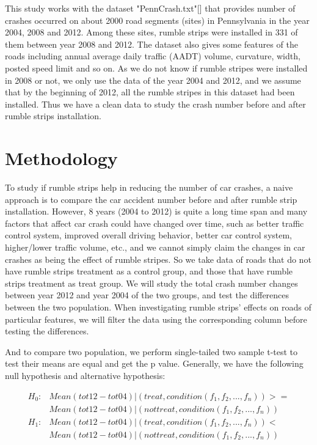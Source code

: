 \documentclass{article}
\begin{document}
This study works with the dataset "PennCrash.txt"[] that provides number of crashes occurred on about 2000 road segments (sites) in Pennsylvania in the year 2004, 2008 and 2012. Among these sites, rumble strips were installed in 331 of them between year 2008 and 2012. The dataset also gives some features of the roads including annual average daily traffic (AADT) volume, curvature, width, posted speed limit and so on. As we do not know if rumble stripes were installed in 2008 or not, we only use the data of the year 2004 and 2012, and we assume that by the beginning of 2012, all the rumble stripes in this dataset had been installed. Thus we have a clean data to study the crash number before and after rumble strips installation.

\section*{Methodology}

To study if rumble strips help in reducing the number of car crashes, a naive approach is to compare the car accident number before and after rumble strip installation. However, 8 years (2004 to 2012) is quite a long time span and many factors that affect car crash could have changed over time, such as better traffic control system, improved overall driving behavior, better car control system, higher/lower traffic volume, etc., and we cannot simply claim the changes in car crashes as being the effect of rumble stripes. So we take data of roads that do not have rumble strips treatment as a control group, and those that have rumble strips treatment as treat group. We will study the total crash number changes between year 2012 and year 2004 of the two groups, and test the differences between the two population. When investigating rumble strips' effects on roads of particular features, we will filter the data using the corresponding column before testing the differences. 

And to compare two population, we perform single-tailed two sample t-test to test their means are equal and get the p value. Generally, we have the following null hypothesis and alternative hypothesis:

\begin{align*}
    H_0: &Mean(tot12-tot04)|(treat, condition(f_1, f_2, ..., f_n)) >= \\
         &Mean(tot12-tot04)|(not treat, condition(f_1, f_2, ..., f_n))\\
    H_1: &Mean(tot12-tot04)|(treat, condition(f_1, f_2, ..., f_n)) < \\
         &Mean(tot12-tot04)|(not treat, condition(f_1, f_2, ..., f_n))\\
\end{align*}
\end{document}

